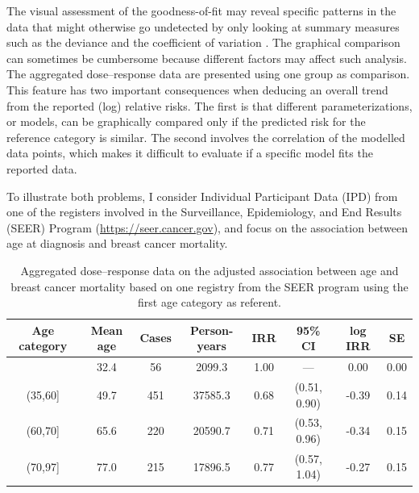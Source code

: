 \documentclass[11pt,a4paper,twoside,openany]{book}\usepackage{knitr}
\begin{document}
{{The visual assessment of the goodness-of-fit may reveal specific patterns in the data that might otherwise go undetected by only looking at summary measures such as the deviance and the coefficient of variation \citep{kvaalseth1985cautionary}. The graphical comparison can sometimes be cumbersome because different factors may affect such analysis. The aggregated dose--response data are presented using one group as comparison. This feature has two important consequences when deducing an overall trend from the reported (log) relative risks. 
The first is that different parameterizations, or models, can be graphically compared only if the predicted risk for the reference category is similar. The second involves the correlation of the modelled data points, which makes it difficult to evaluate if a specific model fits the reported data. 

To illustrate both problems, I consider Individual Participant Data (IPD) from one of the registers involved in the Surveillance, Epidemiology, and End Results (SEER) Program (\url{https://seer.cancer.gov}), and focus on the association between age at diagnosis and breast cancer mortality. 

\begin{table}[ht]
\centering
\caption{Aggregated dose--response data on the adjusted association between age and breast cancer mortality based on one registry from the SEER program using the first age category as referent.
         } 
\label{tab:breast_ad}
\begin{tabular}{cccccccc}
  \hline
Age category & Mean age & Cases & Person-years & IRR & 95\% CI & log IRR & SE \\ 
  \hline
[20,35] & 32.4 & 56 & 2099.3 & 1.00 & --- & 0.00 & 0.00 \\ 
  (35,60] & 49.7 & 451 & 37585.3 & 0.68 & (0.51, 0.90) & -0.39 & 0.14 \\ 
  (60,70] & 65.6 & 220 & 20590.7 & 0.71 & (0.53, 0.96) & -0.34 & 0.15 \\ 
  (70,97] & 77.0 & 215 & 17896.5 & 0.77 & (0.57, 1.04) & -0.27 & 0.15 \\ 
   \hline
\end{tabular}
\end{table}


}}
\end{document}
